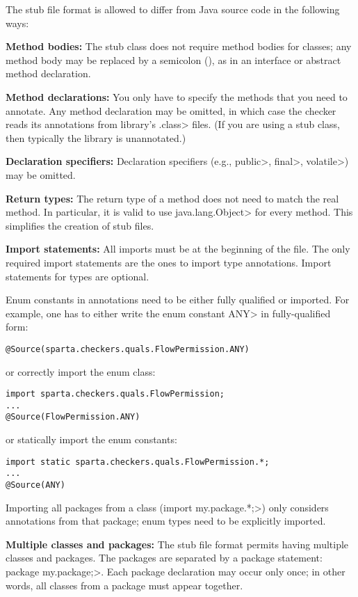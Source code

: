The stub file format is allowed to differ from Java source code in the
following ways:
\begin{description}

\item{\textbf{Method bodies:}}
  The stub class does not require method bodies for classes; any method
  body may be replaced by a semicolon (\code{;}), as in an interface or
  abstract method declaration.

\item{\textbf{Method declarations:}}
  You only have to specify the methods that you need to annotate.
  Any method declaration may be omitted, in which case the checker reads
  its annotations from library's \<.class> files.  (If you are using a stub class, then
  typically the library is unannotated.)

\item{\textbf{Declaration specifiers:}}
  Declaration specifiers (e.g., \<public>, \<final>, \<volatile>)
  may be omitted.

\item{\textbf{Return types:}}
  The return type of a method does not need to match the real method.
  In particular, it is valid to use \<java.lang.Object> for every method.
  This simplifies the creation of stub files.

\item{\textbf{Import statements:}}
  All imports must be at the beginning of the file.
  The only required import statements are the ones to import type
  annotations.  Import statements for types are optional.

  Enum constants in annotations need to be either fully qualified
  or imported.
  For example, one has to either write the enum constant \<ANY> in
  fully-qualified form:

\begin{Verbatim}
@Source(sparta.checkers.quals.FlowPermission.ANY)
\end{Verbatim}

\noindent
or correctly import the enum class:

\begin{Verbatim}
import sparta.checkers.quals.FlowPermission;
...
@Source(FlowPermission.ANY)
\end{Verbatim}

\noindent
or statically import the enum constants:

\begin{Verbatim}
import static sparta.checkers.quals.FlowPermission.*;
...
@Source(ANY)
\end{Verbatim}

  Importing all packages from a class (\<import my.package.*;>) only
  considers annotations from that package; enum types need to be
  explicitly imported.

\item{\textbf{Multiple classes and packages:}}
  The stub file format permits having multiple classes and packages.
  The packages are separated by a package statement:
  \<package my.package;>.  Each package declaration may occur only once; in
  other words, all classes from a package must appear together.

\end{description}
